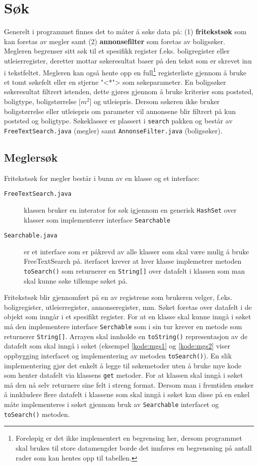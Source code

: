 \section{Søk} \label{sec:sok}
Generelt i programmet finnes det to måter å søke data på: (1) \textbf{fritekstsøk} som kan foretas av megler samt (2) \textbf{annonsefilter} som foretas av boligsøker. Megleren begrenser sitt søk til et spesifikk register f.eks. boligregister eller utleierregister, deretter mottar søkeresultat baser på den tekst som er skrevet inn i tekstfeltet. Megleren kan også hente opp en full\footnote{Foreløpig er det ikke implementert en begrensing her, dersom programmet skal brukes til store datamengder borde det innføres en begrensning på antall rader som kan hentes opp til tabellen.} registerliste gjennom å bruke et tomt søkefelt eller en stjerne "<*"> som søkeparameter. 
En boligsøker søkeresultat filtrert istenden, dette gjøres gjennom å bruke kriterier som poststed, boligtype, boligstørrelse [$m^2$] og utleiepris. Dersom søkeren ikke bruker boligstørrelse eller utleiepris om parameter vil annonsene blir filtrert på kun poststed og boligtype.
Søkeklasser er plassert i \texttt{search} pakken og består av \texttt{FreeTextSearch.java} (megler) samt \texttt{AnnonseFilter.java} (boligsøker).

\subsection{Meglersøk} \label{subsec:sok:megler}
Fritekstsøk for megler består i bunn av en klasse og et interface:
\begin{description}
\item[\texttt{FreeTextSearch.java}] klassen bruker en interator for søk igjennom en generisk \texttt{HashSet} over klasser som implementerer interface \texttt{Searchable}
\item[\texttt{Searchable.java}] er et interface som er påkrevd av alle klasser som skal være mulig å bruke FreeTextSearch på. iterfacet krever at hver klasse implemetrer metoden \texttt{toSearch()} som returnerer en \texttt{String[]} over datafelt i klassen som man skal kunne søke tillempe søket på.
\end{description}

Fritekstsøk blir gjennomført på en av registrene som brukeren velger, f.eks. boligregister, utleierregister, annonseregister, mm. Søket foretas over datafelt i de objekt som inngår i et spesifikt register. For at en klasse skal kunne inngå i søket må den implementere interface \texttt{Serchable} som i sin tur krever en metode som returnerer \texttt{String[]}. Arrayen skal innholde en \texttt{toString()} representasjon av de datafelt som skal inngå i søket (eksempel \ref{kode:mgs1} og \ref{kode:mgs2} viser oppbygging interfacet og implementering av metoden \texttt{toSearch()}). 
En slik implementering gjør det enkelt å legge til søkemetoder uten å bruke mye kode som henter datafelt via klassens \texttt{get} metoder. For at klassen skal inngå i søket må den nå selv returnere sine felt i streng format.
Dersom man i fremtiden ønsker å innkludere flere datafelt i klassene som skal inngå i søket kan disse på en enkel måte implementeres i søket gjennom bruk av \texttt{Searchable} interfacet og \texttt{toSearch()} metoden.

